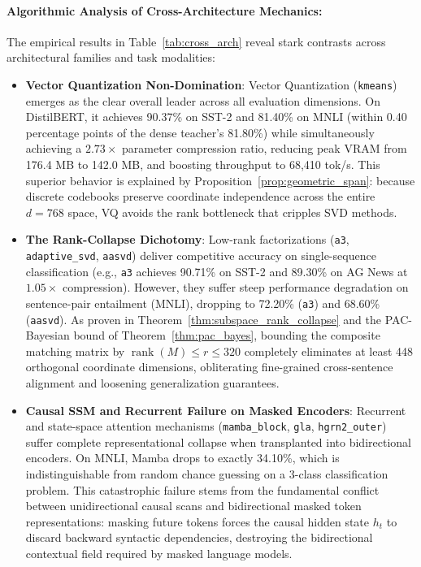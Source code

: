 \documentclass{article}
\begin{document}


\paragraph{Algorithmic Analysis of Cross-Architecture Mechanics:}
The empirical results in Table~\ref{tab:cross_arch} reveal stark contrasts across architectural families and task modalities:
\begin{itemize}
    \item \textbf{Vector Quantization Non-Domination}: Vector Quantization (\texttt{kmeans}) emerges as the clear overall leader across all evaluation dimensions. On DistilBERT, it achieves 90.37\% on SST-2 and 81.40\% on MNLI (within 0.40 percentage points of the dense teacher's 81.80\%) while simultaneously achieving a $2.73\times$ parameter compression ratio, reducing peak VRAM from 176.4 MB to 142.0 MB, and boosting throughput to 68,410 tok/s. This superior behavior is explained by Proposition~\ref{prop:geometric_span}: because discrete codebooks preserve coordinate independence across the entire $d=768$ space, VQ avoids the rank bottleneck that cripples SVD methods.
    \item \textbf{The Rank-Collapse Dichotomy}: Low-rank factorizations (\texttt{a3}, \texttt{adaptive\_svd}, \texttt{aasvd}) deliver competitive accuracy on single-sequence classification (e.g., \texttt{a3} achieves 90.71\% on SST-2 and 89.30\% on AG News at $1.05\times$ compression). However, they suffer steep performance degradation on sentence-pair entailment (MNLI), dropping to 72.20\% (\texttt{a3}) and 68.60\% (\texttt{aasvd}). As proven in Theorem~\ref{thm:subspace_rank_collapse} and the PAC-Bayesian bound of Theorem~\ref{thm:pac_bayes}, bounding the composite matching matrix by $\operatorname{rank}(M) \le r \le 320$ completely eliminates at least 448 orthogonal coordinate dimensions, obliterating fine-grained cross-sentence alignment and loosening generalization guarantees.
    \item \textbf{Causal SSM and Recurrent Failure on Masked Encoders}: Recurrent and state-space attention mechanisms (\texttt{mamba\_block}, \texttt{gla}, \texttt{hgrn2\_outer}) suffer complete representational collapse when transplanted into bidirectional encoders. On MNLI, Mamba drops to exactly 34.10\%, which is indistinguishable from random chance guessing on a 3-class classification problem. This catastrophic failure stems from the fundamental conflict between unidirectional causal scans and bidirectional masked token representations: masking future tokens forces the causal hidden state $h_t$ to discard backward syntactic dependencies, destroying the bidirectional contextual field required by masked language models.

\end{itemize}
\end{document}
